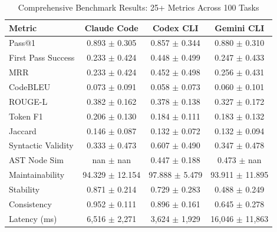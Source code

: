 
\begin{table}[t]
\centering
\caption{Comprehensive Benchmark Results: 25+ Metrics Across 100 Tasks}
\label{tab:comprehensive}
\begin{tabular}{lccc}
\toprule
\textbf{Metric} & \textbf{Claude Code} & \textbf{Codex CLI} & \textbf{Gemini CLI} \\
\midrule
Pass@1 & 0.893 $\pm$ 0.305 & 0.857 $\pm$ 0.344 & 0.880 $\pm$ 0.310 \\
First Pass Success & 0.233 $\pm$ 0.424 & 0.448 $\pm$ 0.499 & 0.247 $\pm$ 0.433 \\
MRR & 0.233 $\pm$ 0.424 & 0.452 $\pm$ 0.498 & 0.256 $\pm$ 0.431 \\
CodeBLEU & 0.073 $\pm$ 0.091 & 0.058 $\pm$ 0.073 & 0.060 $\pm$ 0.101 \\
ROUGE-L & 0.382 $\pm$ 0.162 & 0.378 $\pm$ 0.138 & 0.327 $\pm$ 0.172 \\
Token F1 & 0.206 $\pm$ 0.130 & 0.184 $\pm$ 0.111 & 0.183 $\pm$ 0.132 \\
Jaccard & 0.146 $\pm$ 0.087 & 0.132 $\pm$ 0.072 & 0.132 $\pm$ 0.094 \\
Syntactic Validity & 0.333 $\pm$ 0.473 & 0.607 $\pm$ 0.490 & 0.347 $\pm$ 0.478 \\
AST Node Sim & nan $\pm$ nan & 0.447 $\pm$ 0.188 & 0.473 $\pm$ nan \\
Maintainability & 94.329 $\pm$ 12.154 & 97.888 $\pm$ 5.479 & 93.911 $\pm$ 11.895 \\
Stability & 0.871 $\pm$ 0.214 & 0.729 $\pm$ 0.283 & 0.488 $\pm$ 0.249 \\
Consistency & 0.952 $\pm$ 0.111 & 0.896 $\pm$ 0.161 & 0.645 $\pm$ 0.278 \\
Latency (ms) & 6,516 $\pm$ 2,271 & 3,624 $\pm$ 1,929 & 16,046 $\pm$ 11,863 \\

\bottomrule
\end{tabular}
\end{table}
